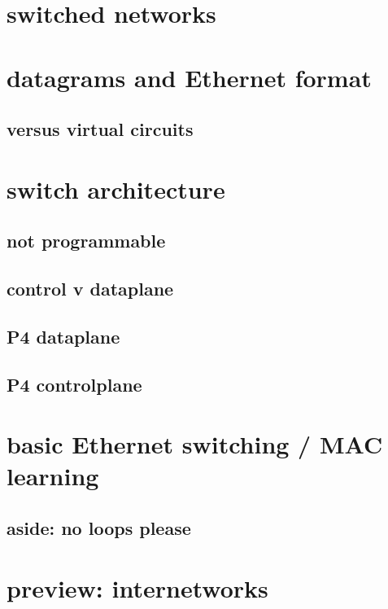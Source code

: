 
\section{switched networks}



\section{datagrams and Ethernet format}




\subsection{versus virtual circuits}



\section{switch architecture}

\subsection{not programmable}


\subsection{control v dataplane}


\subsection{P4 dataplane}


\subsection{P4 controlplane}


\section{basic Ethernet switching / MAC learning}






\subsection{aside: no loops please}



\section{preview: internetworks}


